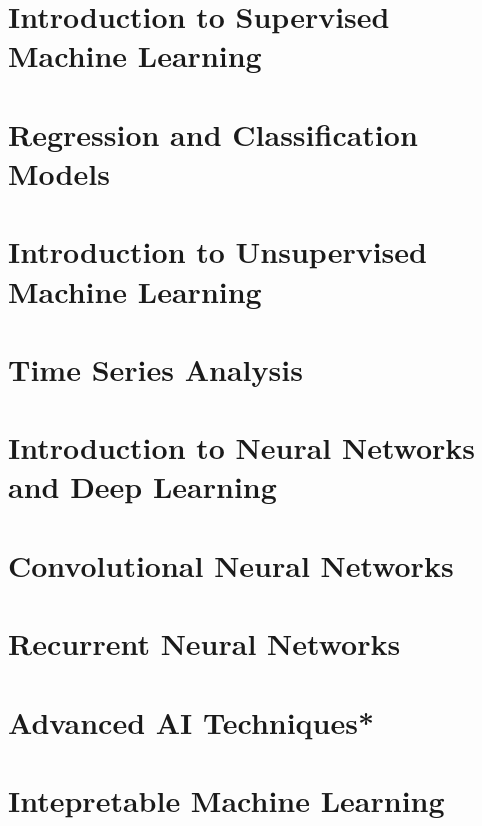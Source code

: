 \documentclass{book}
\begin{document}
\chapter{Introduction to Supervised Machine Learning}


\graphicspath{{class12/}}
\chapter{Regression and Classification Models}


\graphicspath{{class13/}}
\chapter{Introduction to Unsupervised Machine Learning}


{  
\graphicspath{{class14/}}
\chapter{Time Series Analysis}

}

\graphicspath{{class15/}}
\chapter{Introduction to Neural Networks and Deep Learning}


\graphicspath{{class16/}}
\chapter{Convolutional Neural Networks}


\graphicspath{{class17/}}
\chapter{Recurrent Neural Networks}


{  
\graphicspath{{class18/}}
\chapter{Advanced AI Techniques*}

}

\graphicspath{{class19/}}
\chapter{Intepretable Machine Learning}

\end{document}
